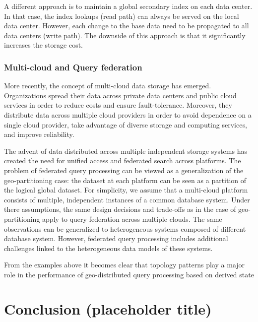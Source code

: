 A different approach is to maintain a global secondary index on each data center.
In that case, the index lookups (read path) can always be served on the local data center.
However, each change to the base data need to be propagated to all data centers (write path).
The downside of this approach is that it significantly increases the storage cost.

\subsubsection{Multi-cloud and Query federation}
More recently, the concept of multi-cloud data storage has emerged.
Organizations spread their data across private data centers and public cloud services in order to reduce costs and
ensure fault-tolerance.
Moreover, they distribute data across multiple cloud providers in order to avoid dependence on a single
cloud provider, take advantage of diverse storage and computing services, and improve reliability.

The advent of data distributed across multiple independent storage systems has created the need for unified access and
federated search across platforms.
The problem of federated query processing can be viewed as a generalization of the geo-partitioning case:
the dataset at each platform can be seen as a partition of the logical global dataset.
For simplicity, we assume that a multi-cloud platform consists of multiple, independent instances of a common database
system.
Under there assumptions, the same design decisions and trade-offs as in the case of geo-partitioning apply to query
federation across multiple clouds.
The same observations can be generalized to heterogeneous systems composed of different database system.
However, federated query processing includes additional challenges linked to the heterogeneous data models of these
systems.

\bigskip

From the examples above it becomes clear that topology patterns play a major role in the performance of geo-distributed
query processing based on derived state

\section{Conclusion (placeholder title)}


